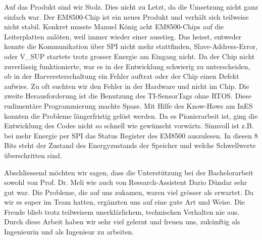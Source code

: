 Auf das Produkt sind wir Stolz. Dies nicht zu Letzt, da die Umsetzung nicht ganz einfach war. Der EM8500-Chip ist ein neues Produkt und verhält sich teilweise nicht stabil. Konkret musste Manuel König acht EM8500-Chips auf die Leiterplatten anlöten, weil immer wieder einer ausstieg. Das heisst, entweder konnte die Kommunikation über SPI nicht mehr stattfinden, Slave-Address-Error, oder V_SUP startete trotz grosser Energie am Eingang nicht. Da der Chip nicht zuverlässig funktionierte, war es in der Entwicklung schwierig zu unterscheiden, ob in der Harversterschaltung ein Fehler auftrat oder der Chip einen Defekt aufwies. Zu oft suchten wir den Fehler in der Hardware und nicht im Chip. Die zweite Herausforderung ist die Benutzung des TI-SensorTags ohne RTOS. Diese rudimentäre Programmierung machte Spass. Mit Hilfe des Know-Hows am InES konnten die Probleme längerfristig gelöst werden. Da es Pionierarbeit ist, ging die Entwicklung des Codes nicht so schnell wie gewünscht vorwärts. Sinnvoll ist z.B. bei mehr Energie per SPI das Status Register des EM8500 auszulesen. In diesen 8 Bits steht der Zustand des Energyzustands der Speicher und welche Schwellwerte überschritten sind. 

Abschliessend möchten wir sagen, dass die Unterstützung bei der Bachelorarbeit sowohl von Prof. Dr. Meli wie auch von Research-Assistent Dario Dündar sehr gut war. Die Probleme, die auf uns zukamen, waren viel grösser als erwartet. Da wir es super im Team hatten, ergänzten uns auf eine gute Art und Weise. Die Freude blieb trotz teilweisem unerklärlichem, technischen Verhalten nie aus. Durch diese Arbeit haben wir sehr viel gelernt und freuen uns, zukünftig als Ingenieurin und als Ingenieur zu arbeiten.



